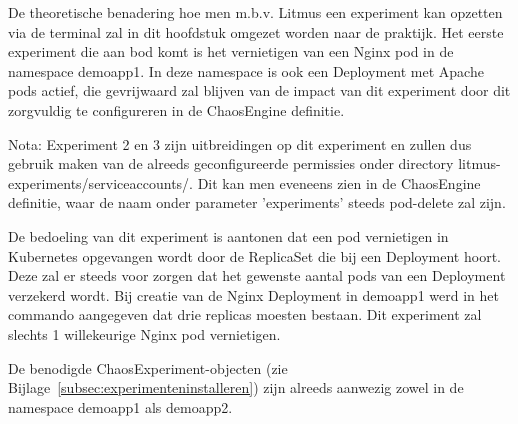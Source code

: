 De theoretische benadering hoe men m.b.v. Litmus een experiment kan opzetten via de terminal zal in dit hoofdstuk omgezet worden naar de praktijk. Het eerste experiment die aan bod komt is het vernietigen van een Nginx pod in de namespace demoapp1. In deze namespace is ook een Deployment met Apache pods actief, die gevrijwaard zal blijven van de impact van dit experiment door dit zorgvuldig te configureren in de ChaosEngine definitie. 

Nota: Experiment 2 en 3 zijn uitbreidingen op dit experiment en zullen dus gebruik maken van de alreeds geconfigureerde permissies onder directory litmus-experiments/serviceaccounts/. Dit kan men eveneens zien in de ChaosEngine definitie, waar de naam onder parameter 'experiments' steeds pod-delete zal zijn. 

De bedoeling van dit experiment is aantonen dat een pod vernietigen in Kubernetes opgevangen wordt door de ReplicaSet die bij een Deployment hoort. Deze zal er steeds voor zorgen dat het gewenste aantal pods van een Deployment verzekerd wordt. Bij creatie van de Nginx Deployment in demoapp1 werd in het commando aangegeven dat drie replicas moesten bestaan. Dit experiment zal slechts 1 willekeurige Nginx pod vernietigen.  

De benodigde ChaosExperiment-objecten (zie Bijlage~\ref{subsec:experimenteninstalleren}) zijn alreeds aanwezig zowel in de namespace demoapp1 als demoapp2.
  
